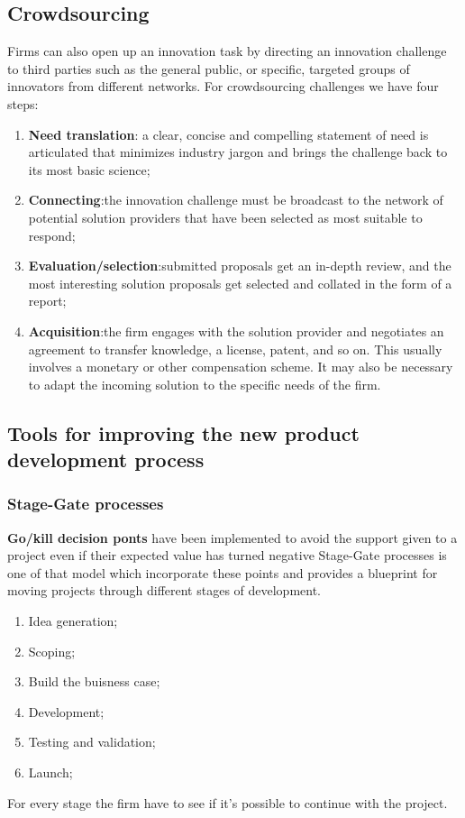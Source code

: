 \documentclass[12pt]{article}
\begin{document}
\subsection{Crowdsourcing}
Firms can also open up an innovation task by directing an innovation challenge to third
parties such as the general public, or specific, targeted groups of innovators from different networks.
For crowdsourcing challenges we have four steps:
\begin{enumerate}
    \item \textbf{Need translation}: a clear, concise and compelling statement of need is articulated that minimizes industry jargon and brings the challenge back to its most basic science;
    \item \textbf{Connecting}:the innovation challenge must be broadcast to the network of potential solution providers that have been selected as most suitable to respond;
    \item \textbf{Evaluation/selection}:submitted proposals get an in-depth review, and the most
    interesting solution proposals get selected and collated in the form of a report;
    \item \textbf{Acquisition}:the firm engages with the solution provider and negotiates an agreement to transfer knowledge, a license, patent, and so on. This usually involves a
    monetary or other compensation scheme. It may also be necessary to adapt the
    incoming solution to the specific needs of the firm.
\end{enumerate}

\subsection{Tools for improving the new product development process}
\subsubsection{Stage-Gate processes}
\textbf{Go/kill decision ponts} have been implemented to avoid the support given to a project even if their expected value has turned negative
Stage-Gate processes is one of that model which incorporate these points and provides a blueprint for moving projects through different stages of development.
\begin{enumerate}
    \item Idea generation;
    \item Scoping;
    \item Build the buisness case;
    \item Development;
    \item Testing and validation;
    \item Launch;
\end{enumerate}
For every stage the firm have to see if it's possible to continue with the project.
\end{document}
